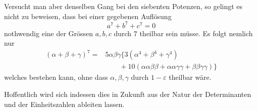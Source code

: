 Versucht man aber denselben Gang bei den siebenten Potenzen, so gelingt es nicht zu beweisen, dass bei einer gegebenen Auflösung
%
\[
a^7+b^7+c^7=0
\]
nothwendig eine der Grössen $a,b,c$ durch $7$ theilbar sein müsse. Es folgt nemlich nur
\[
\begin{aligned}
(\alpha+\beta+\gamma)^7={}&5\alpha\beta\gamma\{3(\alpha^4+\beta^4+\gamma^4)\\
&\qquad+10(\alpha\alpha\beta\beta+\alpha\alpha\gamma\gamma+\beta\beta\gamma\gamma)\}
\end{aligned}
\]
welches bestehen kann, ohne dass $\alpha,\beta,\gamma$ durch $1-\varepsilon$ theilbar wäre.

Hoffentlich wird sich indessen dies in Zukunft aus der Natur der Determinanten und der Einheitszahlen ableiten lassen.

